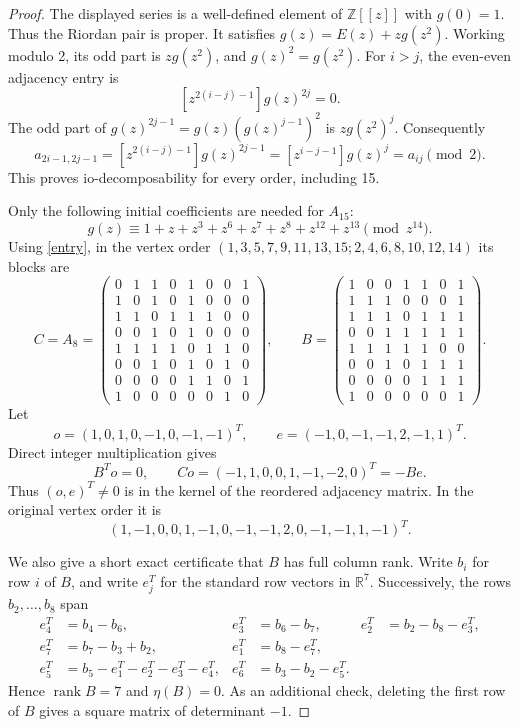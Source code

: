 \documentclass[10pt]{article}
\begin{document}
\begin{proof}
The displayed series is a well-defined element of \(\mathbb Z[[z]]\)
with \(g(0)=1\). Thus the Riordan pair is proper. It satisfies
\(g(z)=E(z)+zg(z^2)\). Working modulo 2, its odd part is
\(zg(z^2)\), and \(g(z)^2=g(z^2)\). For \(i>j\), the
even-even adjacency entry is
\[
 [z^{2(i-j)-1}]g(z)^{2j}=0.
\]
The odd part of \(g(z)^{2j-1}=g(z)(g(z)^{j-1})^2\) is
\(zg(z^2)^j\). Consequently
\[
 a_{2i-1,2j-1}=[z^{2(i-j)-1}]g(z)^{2j-1}
              =[z^{i-j-1}]g(z)^j=a_{ij}\pmod2.
\]
This proves io-decomposability for every order, including 15.

Only the following initial coefficients are needed for \(A_{15}\):
\[
 g(z)\equiv1+z+z^3+z^6+z^7+z^8+z^{12}+z^{13}
                  \pmod {z^{14}}.
\]
Using \eqref{entry}, in the vertex order
\((1,3,5,7,9,11,13,15;2,4,6,8,10,12,14)\) its blocks are
\[
 C=A_8=\begin{pmatrix}
0&1&1&0&1&0&0&1\\
1&0&1&0&1&0&0&0\\
1&1&0&1&1&1&0&0\\
0&0&1&0&1&0&0&0\\
1&1&1&1&0&1&1&0\\
0&0&1&0&1&0&1&0\\
0&0&0&0&1&1&0&1\\
1&0&0&0&0&0&1&0
\end{pmatrix},\qquad
 B=\begin{pmatrix}
1&0&0&1&1&0&1\\
1&1&1&0&0&0&1\\
1&1&1&0&1&1&1\\
0&0&1&1&1&1&1\\
1&1&1&1&1&0&0\\
0&0&1&0&1&1&1\\
0&0&0&0&1&1&1\\
1&0&0&0&0&0&1
\end{pmatrix}.
\]
Let
\[
 o=(1,0,1,0,-1,0,-1,-1)^T,\qquad
 e=(-1,0,-1,-1,2,-1,1)^T.
\]
Direct integer multiplication gives
\[
 B^To=0,\qquad
 Co=(-1,1,0,0,1,-1,-2,0)^T=-Be.
\]
Thus \((o,e)^T\ne0\) is in the kernel of the reordered adjacency
matrix. In the original vertex order it is
\[
 (1,-1,0,0,1,-1,0,-1,-1,2,0,-1,-1,1,-1)^T.
\]

We also give a short exact certificate that \(B\) has full column
rank. Write \(b_i\) for row \(i\) of \(B\), and write
\(e_j^T\) for the standard row vectors in \(\mathbb R^7\).
Successively, the rows \(b_2,\ldots,b_8\) span
\begin{align*}
 e_4^T&=b_4-b_6,&e_3^T&=b_6-b_7,&e_2^T&=b_2-b_8-e_3^T,\\
 e_7^T&=b_7-b_3+b_2,&e_1^T&=b_8-e_7^T,\\
 e_5^T&=b_5-e_1^T-e_2^T-e_3^T-e_4^T,&
 e_6^T&=b_3-b_2-e_5^T.
\end{align*}
Hence \(\operatorname{rank}B=7\) and \(\eta(B)=0\).
As an additional check, deleting the first row of \(B\) gives
a square matrix of determinant \(-1\).


\end{proof}
\end{document}
